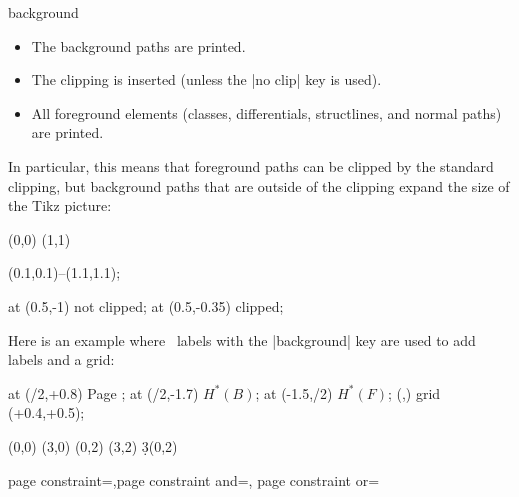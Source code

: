 \documentclass{ltxdoc}
\begin{document}
\begin{sseqdata}[name=ex1,degree={#1}{1-#1}]
\begin{key}{background}
\begin{itemize}
\item The \tikzname\space background paths are printed.

\item The clipping is inserted (unless the |no clip| key is used).

\item All foreground elements (classes, differentials, structlines, and normal \tikzname\space paths) are printed.
\end{itemize}

In particular, this means that foreground \tikzname\space paths can be clipped by the standard clipping, but background paths that are outside of the clipping expand the size of the Tikz picture:
\begin{codeexample}[]
\begin{sseqpage}
\class(0,0)
\class(1,1)
\begin{scope}
\draw(0.1,0.1)--(1.1,1.1);
\end{scope}
\node[background] at (0.5,-1) {not clipped};
\node at (0.5,-0.35) {clipped};
\end{sseqpage}
\end{codeexample}
Here is an example where \tikzname\ labels with the |background| key are used to add labels and a grid:
\begin{codeexample}[]
\begin{sseqdata}[name=tikz background example, cohomological Serre grading,
                 classes=fill]
\begin{scope}[background]
\node at (\xmax/2,\ymax+0.8) {\textup{Page \page{}}};
\node at (\xmax/2,-1.7) {$H^*(B)$};
\node[rotate=90] at (-1.5,\ymax/2) {$H^*(F)$};
\draw[step=1cm,gray,very thin] (,) grid (\xmax+0.4,\ymax+0.5);
\end{scope}
\class(0,0)
\class(3,0)
\class(0,2)
\class(3,2)
\d3(0,2)
\end{sseqdata}
\printpage[name=tikz background example, page=2]
\printpage[name=tikz background example, page=3]
\end{codeexample}
\end{key}

\begin{keylist}{page constraint=,page constraint and=, page constraint or=}

\end{keylist}


\end{sseqdata}
\end{document}
